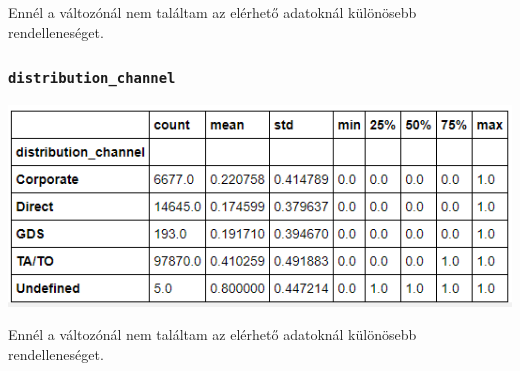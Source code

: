 Ennél a változónál nem találtam az elérhető adatoknál különösebb rendelleneséget.

\subsubsection{\texttt{distribution\_channel}}
\includegraphics{images/4.fejezet/4.korrelacios6.PNG}

Ennél a változónál nem találtam az elérhető adatoknál különösebb rendelleneséget.